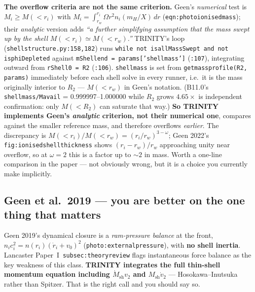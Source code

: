 \documentclass[11pt,a4paper,oneside]{report}
\newcommand{\brkus}{\textunderscore\allowbreak}
\newcommand{\code}[1]{\texttt{\small\let\_\brkus #1}}
\newcommand{\lbl}[1]{\texttt{\footnotesize\let\_\brkus #1}}
\newcommand{\PI}{Paper~I}
\newcommand{\ci}{c_i}
\newcommand{\Msh}{M_{\mathrm{sh}}}
\newcommand{\up}[1]{\textcolor{tqaccent}{\textbf{#1}}}
\begin{document}
\medskip
\textbf{The overflow criteria are not the same criterion.} Geen's \emph{numerical} test is
$M_i \ge M(<r_i)$ with $M_i=\int_{r_w}^{r_i}\Omega r^2n_i(m_H/X)\,dr$
(\lbl{eqn:photoionised\_mass}); their \emph{analytic} version adds \emph{``a further
simplifying assumption that the mass swept up by the shell $M(<r_i)\simeq M(<r_w)$.''}
TRINITY's loop (\code{shell\_structure.py:158,182}) runs
\code{while not is\_allMassSwept and not is\_phiDepleted} against
\code{mShell\_end = params['shell\_mass']} (\code{:107}), integrating outward from
\code{rShell0 = R2} (\code{:106}). \code{shell\_mass} is set from \code{get\_mass\_profile(R2,
params)} immediately before each shell solve in every runner, i.e.\ it is the mass originally
interior to $R_2$ --- $M(<r_w)$ in Geen's notation. (B11.0's \code{shell\_mass/M\_avail} =
0.999997--1.000000 while $R_2$ grows $4.65\times$ is independent confirmation: only $M(<R_2)$ can
saturate that way.) \up{So TRINITY implements Geen's \emph{analytic}
criterion, not their numerical one}, compares against the smaller reference mass, and
therefore overflows \emph{earlier}. The discrepancy is $M(<r_i)/M(<r_w) = (r_i/r_w)^{3-\omega}$;
Geen 2022's \lbl{fig:ionisedshellthickness} shows $(r_i-r_w)/r_w$ approaching unity near
overflow, so at $\omega=2$ this is a factor up to ${\sim}2$ in mass. Worth a one-line
comparison in the paper --- not obviously wrong, but it is a choice you currently make
implicitly.

\subsection{Geen et al.\ 2019 --- you are better on the one thing that matters}
\label{sec:geen19}

Geen 2019's dynamical closure is a \emph{ram-pressure balance} at the front,
$n_i\ci^2 = n(r_i)(\dot r_i+v_0)^2$ (\lbl{photo:externalpressure}), with \up{no shell
inertia}. Lancaster \PI\ \lbl{subsec:theory\_review} flags instantaneous force balance as
the key weakness of this class. \up{TRINITY integrates the full thin-shell momentum equation
including $\dot\Msh v_2$ and $\Msh\dot v_2$} --- Hosokawa--Inutsuka rather than Spitzer.
That is the right call and you should say so.
\end{document}
